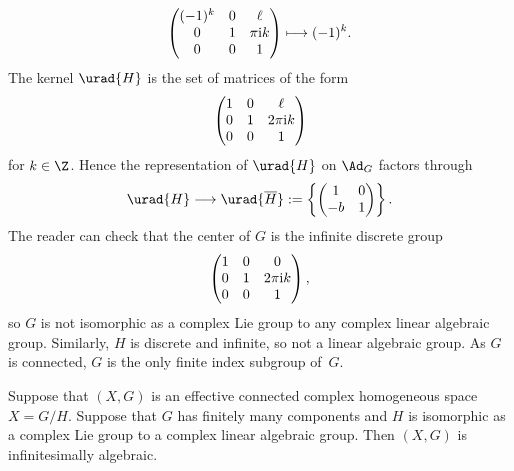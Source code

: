 \begin{Example}
\[\begin{pmatrix}
(-1)^k & 0 & \ell \\
0 & 1 & \pi {\rm i} k \\
0 & 0 & 1
\end{pmatrix}
 \longmapsto (-1)^k.
\]
The kernel $\urad{H}$ is the set of matrices of the form
\[
\begin{pmatrix}
1 & 0 & \ell \\
0 & 1 & 2\pi {\rm i} k \\
0 & 0 & 1
\end{pmatrix}
\]
for $k \in \Z$.
Hence the representation of $\urad{H}$ on $\Ad_G$ factors through
\[
\urad{H} \longrightarrow \urad{\overline{H}} := \left\{\begin{pmatrix}1&0\\-b&1\end{pmatrix}\right\}.
\]
The reader can check that the center of $G$ is the infinite discrete group
\[
\begin{pmatrix}
1 & 0 & 0 \\
0 & 1 & 2\pi {\rm i} k \\
0 & 0 & 1
\end{pmatrix},
\]
so $G$ is not isomorphic as a complex Lie group to any complex linear algebraic group.
Similarly, $H$ is discrete and infinite, so not a linear algebraic group.
As $G$ is connected, $G$ is the only finite index subgroup of~$G$.
\end{Example}

\begin{Lemma}
Suppose that $(X, G)$ is an effective connected complex homogeneous space $X=G/H$.
Suppose that $G$ has finitely many components and $H$ is isomorphic as a complex Lie group to a complex linear algebraic group.
Then $(X, G)$ is infinitesimally algebraic.
\end{Lemma}

